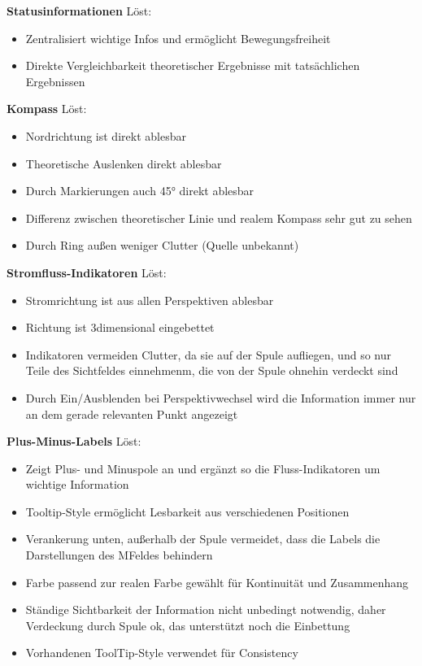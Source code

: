 \textbf{Statusinformationen}
Löst: 
\begin{itemize}
	\item Zentralisiert wichtige Infos und ermöglicht Bewegungsfreiheit
	\item Direkte Vergleichbarkeit theoretischer Ergebnisse mit tatsächlichen Ergebnissen
\end{itemize}

\textbf{Kompass}
Löst: 
\begin{itemize}
	\item Nordrichtung ist direkt ablesbar
	\item Theoretische Auslenken direkt ablesbar
	\item Durch Markierungen auch 45° direkt ablesbar
	\item Differenz zwischen theoretischer Linie und realem Kompass sehr gut zu sehen
	\item Durch Ring außen weniger Clutter (Quelle unbekannt)
\end{itemize}

\textbf{Stromfluss-Indikatoren}
Löst: 
\begin{itemize}
	\item Stromrichtung ist aus allen Perspektiven ablesbar
	\item Richtung ist 3dimensional eingebettet
	\item Indikatoren vermeiden Clutter, da sie auf der Spule aufliegen, und so nur Teile des Sichtfeldes einnehmenm, die von der Spule ohnehin verdeckt sind
	\item Durch Ein/Ausblenden bei Perspektivwechsel wird die Information immer nur an dem gerade relevanten Punkt angezeigt
\end{itemize}

\textbf{Plus-Minus-Labels}
Löst: 
\begin{itemize}
	\item Zeigt Plus- und Minuspole an und ergänzt so die Fluss-Indikatoren um wichtige Information
	\item Tooltip-Style ermöglicht Lesbarkeit aus verschiedenen Positionen
	\item Verankerung unten, außerhalb der Spule vermeidet, dass die Labels die Darstellungen des MFeldes behindern
	\item Farbe passend zur realen Farbe gewählt für Kontinuität und Zusammenhang
	\item Ständige Sichtbarkeit der Information nicht unbedingt notwendig, daher Verdeckung durch Spule ok, das unterstützt noch die Einbettung
	\item Vorhandenen ToolTip-Style verwendet für Consistency
\end{itemize}

